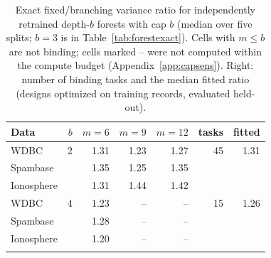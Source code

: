 \begin{table}[t]
\centering
\caption{Exact fixed/branching variance ratio for independently retrained depth-$b$ forests with cap $b$ (median over five splits; $b=3$ is in Table~\ref{tab:forestexact}). Cells with $m\le b$ are not binding; cells marked -- were not computed within the compute budget (Appendix~\ref{app:capsens}). Right: number of binding tasks and the median fitted ratio (designs optimized on training records, evaluated held-out).}
\label{tab:capgrid}
\small
\setlength{\tabcolsep}{3.5pt}
\begin{tabular}{lrrrrrr}
\toprule
Data & $b$ & $m=6$ & $m=9$ & $m=12$ & tasks & fitted \\
\midrule
WDBC & 2 & 1.31 & 1.23 & 1.27 & 45 & 1.31 \\
Spambase & & 1.35 & 1.25 & 1.35 & & \\
Ionosphere & & 1.31 & 1.44 & 1.42 & & \\
\addlinespace[1pt]
WDBC & 4 & 1.23 & -- & -- & 15 & 1.26 \\
Spambase & & 1.28 & -- & -- & & \\
Ionosphere & & 1.20 & -- & -- & & \\
\addlinespace[1pt]
\bottomrule
\end{tabular}
\end{table}
